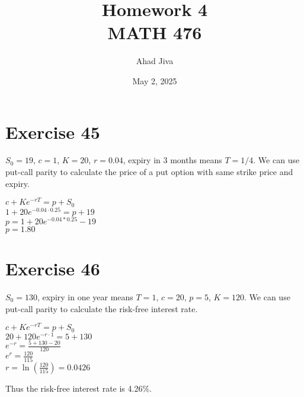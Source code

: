 \documentclass{article}
\title{Homework 4 \\ \large MATH 476}
\author{Ahad Jiva}
\date{May 2, 2025}
\begin{document}
\maketitle
\section*{Exercise 45}
\begin{flushleft}
    $S_0 = 19$, $c=1$, $K=20$, $r=0.04$, expiry in 3 months means $T = 1/4$.
    We can use put-call parity to calculate the price of a put option with same strike price and expiry.
    \begin{center}
        $c + Ke^{-rT} = p + S_0$ \\
        $1 + 20e^{-0.04 \cdot 0.25} = p + 19$ \\
        $p = 1 + 20e^{-0.04 * 0.25} - 19$ \\
        $p = 1.80$
    \end{center}
\end{flushleft}

\section*{Exercise 46}
\begin{flushleft}
    $S_0 = 130$, expiry in one year means $T=1$, $c = 20$, $p=5$, $K = 120$.
    We can use put-call parity to calculate the risk-free interest rate.
    \begin{center}
        $c + Ke^{-rT} = p + S_0$ \\
        $20 + 120e^{-r \cdot 1} = 5 + 130$ \\
        $e^{-r} = \frac{5+130-20}{120}$ \\
        $e^r = \frac{120}{115}$ \\
        $r = \ln(\frac{120}{115}) = 0.0426$ \\
    \end{center}
    Thus the risk-free interest rate is 4.26\%.
\end{flushleft}
\end{document}
